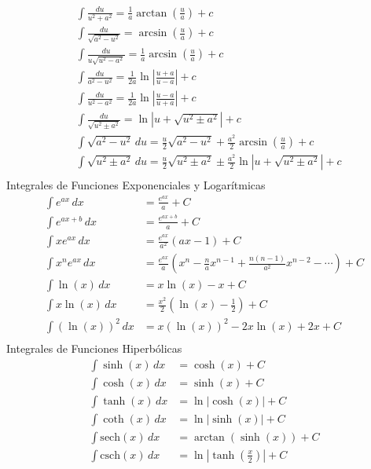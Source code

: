 \begin{align}
    &\int \frac{du}{u^2 + a^2} = \frac{1}{a} \arctan{\left(\frac{u}{a}\right)} + c\\
    &\int \frac{du}{\sqrt{a^2 - u^2}} = \arcsin{\left(\frac{u}{a}\right)} + c\\
    &\int \frac{du}{u \sqrt{u^2 - a^2}} = \frac{1}{a}\arcsin{\left(\frac{u}{a}\right)} + c\\
    &\int \frac{du}{a^2 - u^2} = \frac{1}{2a} \ln{\left\lvert \frac{u + a}{u - a}\right\rvert } + c\\
    &\int \frac{du}{u^2 - a^2} = \frac{1}{2a}\ln{\left\lvert \frac{u - a}{u + a}\right\rvert } + c\\
    &\int \frac{du}{\sqrt{u^2 \pm a^2}} = \ln{\left\lvert u + \sqrt{u^2 \pm  a^2}\right\rvert } + c\\
    &\int \sqrt{a^2 - u^2}\, du = \frac{u}{2} \sqrt{a^2 - u^2} + \frac{a^2}{2}\arcsin{\left(\frac{u}{a}\right)} + c\\
    &\int \sqrt{u^2 \pm  a^2}\, du = \frac{u}{2}\sqrt{u^2 \pm a^2} \pm \frac{a^2}{2}\ln{\left\lvert u + \sqrt{u^2 \pm a^2} \right\rvert } + c\\
\end{align}
Integrales de Funciones Exponenciales y Logarítmicas
\begin{align*}
    \int e^{ax} \, dx &= \frac{e^{ax}}{a} + C \\
    \int e^{ax + b} \, dx &= \frac{e^{ax + b}}{a} + C \\
    \int xe^{ax} \, dx &= \frac{e^{ax}}{a^2} (ax - 1) + C \\
    \int x^n e^{ax} \, dx &= \frac{e^{ax}}{a} \left( x^n - \frac{n}{a} x^{n-1} + \frac{n(n-1)}{a^2} x^{n-2} - \cdots \right) + C \\
    \int \ln(x) \, dx &= x\ln(x) - x + C \\
    \int x \ln(x) \, dx &= \frac{x^2}{2} (\ln(x) - \frac{1}{2}) + C \\
    \int (\ln(x))^2 \, dx &= x(\ln(x))^2 - 2x\ln(x) + 2x + C \\
\end{align*}
Integrales de Funciones Hiperbólicas
\begin{align*}
\int \sinh(x) \, dx &= \cosh(x) + C \\
\int \cosh(x) \, dx &= \sinh(x) + C \\
\int \tanh(x) \, dx &= \ln|\cosh(x)| + C \\
\int \coth(x) \, dx &= \ln|\sinh(x)| + C \\
\int \text{sech}(x) \, dx &= \arctan(\sinh(x)) + C \\
\int \text{csch}(x) \, dx &= \ln|\tanh(\frac{x}{2})| + C \\
\end{align*}

